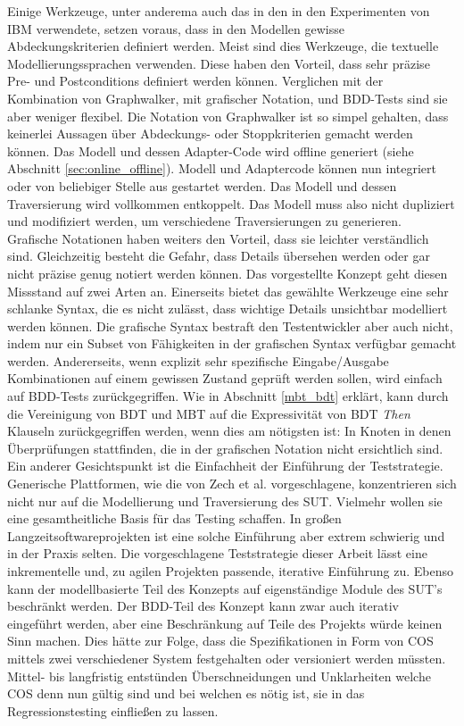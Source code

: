 Einige Werkzeuge, unter anderema auch das in den in den Experimenten von IBM \cite{farchi_using_2002} verwendete, setzen voraus, dass in den Modellen gewisse Abdeckungskriterien definiert werden. Meist sind dies Werkzeuge, die textuelle Modellierungssprachen verwenden. Diese haben den Vorteil, dass sehr präzise Pre- und Postconditions definiert werden können. Verglichen mit der Kombination von Graphwalker, mit grafischer Notation, und BDD-Tests sind sie aber weniger flexibel. Die Notation von Graphwalker ist so simpel gehalten, dass keinerlei Aussagen über Abdeckungs- oder Stoppkriterien gemacht werden können. Das Modell und dessen Adapter-Code wird offline generiert (siehe Abschnitt  \ref{sec:online_offline}). Modell und Adaptercode können nun integriert oder von beliebiger Stelle aus gestartet werden. Das Modell und dessen Traversierung wird vollkommen entkoppelt. Das Modell muss also nicht dupliziert und modifiziert werden, um verschiedene Traversierungen zu generieren.\\
Grafische Notationen haben weiters den Vorteil, dass sie leichter verständlich sind. Gleichzeitig besteht die Gefahr, dass Details übersehen werden oder gar nicht präzise genug notiert werden können. Das vorgestellte Konzept geht diesen Missstand auf zwei Arten an. Einerseits bietet das gewählte Werkzeuge eine sehr schlanke Syntax, die es nicht zulässt, dass wichtige Details unsichtbar modelliert werden können. Die grafische Syntax bestraft den Testentwickler aber auch nicht, indem nur ein Subset von Fähigkeiten in der grafischen Syntax verfügbar gemacht werden. Andererseits, wenn explizit sehr spezifische Eingabe/Ausgabe Kombinationen auf einem gewissen Zustand geprüft werden sollen, wird einfach auf BDD-Tests zurückgegriffen. Wie in Abschnitt \ref{mbt_bdt} erklärt, kann durch die Vereinigung von \Gls{BDT} und \Gls{MBT} auf die Expressivität von \Gls{BDT} \textit{Then} Klauseln zurückgegriffen werden, wenn dies am nötigsten ist: In Knoten in denen Überprüfungen stattfinden, die in der grafischen Notation nicht ersichtlich sind.\\
Ein anderer Gesichtspunkt ist die Einfachheit der Einführung der Teststrategie. Generische Plattformen, wie die von Zech et al. \cite{zech_generic_2012} vorgeschlagene, konzentrieren sich nicht nur auf die Modellierung und Traversierung des \Gls{SUT}. Vielmehr wollen sie eine gesamtheitliche Basis für das Testing schaffen. In großen Langzeitsoftwareprojekten ist eine solche Einführung aber extrem schwierig und in der Praxis selten. Die vorgeschlagene Teststrategie dieser Arbeit lässt eine inkrementelle und, zu agilen Projekten passende, iterative Einführung zu. Ebenso kann der modellbasierte Teil des Konzepts auf eigenständige Module des SUT's beschränkt werden. Der BDD-Teil des Konzept kann zwar auch iterativ eingeführt werden, aber eine Beschränkung auf Teile des Projekts würde keinen Sinn machen. Dies hätte zur Folge, dass die Spezifikationen in Form von \Gls{COS} mittels zwei verschiedener System festgehalten oder versioniert werden müssten. Mittel- bis langfristig entstünden Überschneidungen und Unklarheiten welche \Gls{COS} denn nun gültig sind und bei welchen es nötig ist, sie in das Regressionstesting einfließen zu lassen.\\
